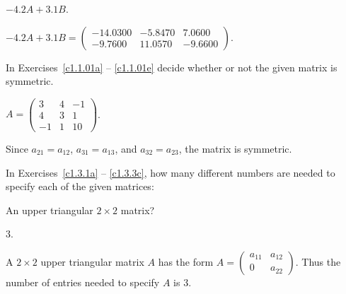 \documentclass{article}
\begin{document}
\begin{computerExercise}  \label{c1.2.4a}
$-4.2A+3.1B$.

\begin{solution}
\ans $-4.2A + 3.1B = \left(\begin{array}{rrr} 
-14.0300 & -5.8470 &    7.0600 \\
 -9.7600 & 11.0570 &   -9.6600\end{array}\right)$.

\end{solution}
\end{computerExercise}





\problemlabel

\noindent In Exercises~\ref{c1.1.01a} -- \ref{c1.1.01e} decide whether or
not the given matrix is symmetric.


\begin{exercise} \label{c1.1.01e}
 $A = \left( \begin{array}{rrr}
 3 & 4 & -1\\
 4 & 3 &  1\\
 -1 & 1 & 10\end{array} \right)$.
       

\begin{solution}
\ans Since $a_{21} = a_{12}$, $a_{31} = a_{13}$, and $a_{32} = a_{23}$, the matrix is symmetric.

\end{solution}
\end{exercise}





\problemlabel

In Exercises~\ref{c1.3.1a} -- \ref{c1.3.3c}, how many different numbers
are needed to specify each of the given matrices:


\begin{exercise}  \label{c1.3.1a}
An upper triangular $2\times 2$ matrix?

\begin{solution}
\ans $3$.

\soln A $2\times 2$ upper triangular matrix $A$ has the form $A = \left( \begin{array}{cc}
            a_{11} & a_{12} \\
            0 & a_{22} \end{array} \right)$.  Thus the number of entries needed to specify $A$ is $3$.  

\end{solution}
\end{exercise}
\end{document}
